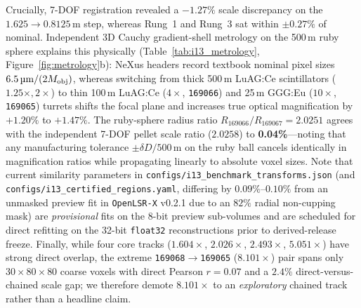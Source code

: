 \documentclass[10pt]{article}
\begin{document}
Crucially, 7-DOF registration revealed a $-1.27\%$ scale discrepancy on the $1.625 \to 0.8125$\,\textmu m step, whereas Rung~1 and Rung~3 sat within $\pm 0.27\%$ of nominal. Independent 3D Cauchy gradient-shell metrology on the 500\,\textmu m ruby sphere explains this physically (Table~\ref{tab:i13_metrology}, Figure~\ref{fig:metrology}b): NeXus headers record textbook nominal pixel sizes $6.5\,\text{\textmu m}/(2 M_{\mathrm{obj}})$, whereas switching from thick 500\,\textmu m LuAG:Ce scintillators ($1.25\times, 2\times$) to thin 100\,\textmu m LuAG:Ce ($4\times$, \texttt{169066}) and 25\,\textmu m GGG:Eu ($10\times$, \texttt{169065}) turrets shifts the focal plane and increases true optical magnification by $+1.20\%$ to $+1.47\%$. The ruby-sphere radius ratio $R_{169066}/R_{169067} = 2.0251$ agrees with the independent 7-DOF pellet scale ratio ($2.0258$) to \textbf{0.04\%}---noting that any manufacturing tolerance $\pm \delta D / 500$\,\textmu m on the ruby ball cancels identically in magnification ratios while propagating linearly to absolute voxel sizes. Note that current similarity parameters in \texttt{configs/i13\_benchmark\_transforms.json} (and \texttt{configs/i13\_certified\_regions.yaml}, differing by $0.09\%$--$0.10\%$ from an unmasked preview fit in \texttt{OpenLSR-X} v0.2.1 due to an $82\%$ radial non-cupping mask) are \emph{provisional} fits on the 8-bit preview sub-volumes and are scheduled for direct refitting on the 32-bit \texttt{float32} reconstructions prior to derived-release freeze. Finally, while four core tracks ($1.604\times$, $2.026\times$, $2.493\times$, $5.051\times$) have strong direct overlap, the extreme \texttt{169068}$\to$\texttt{169065} ($8.101\times$) pair spans only $30 \times 80 \times 80$ coarse voxels with direct Pearson $r = 0.07$ and a $2.4\%$ direct-versus-chained scale gap; we therefore demote $8.101\times$ to an \emph{exploratory} chained track rather than a headline claim.
\end{document}
